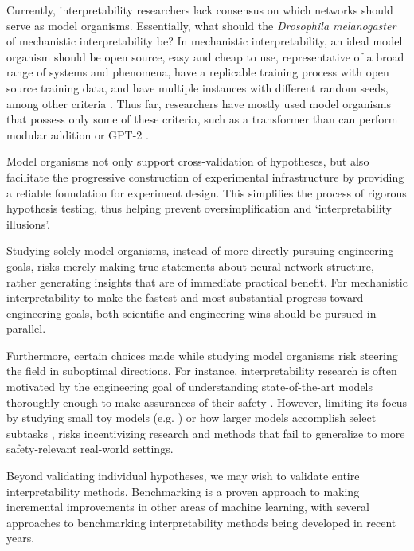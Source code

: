 Currently, interpretability researchers lack consensus on which networks should serve as model organisms. Essentially, what should the \textit{Drosophila melanogaster} of mechanistic interpretability be? In mechanistic interpretability, an ideal model organism should be open source, easy and cheap to use, representative of a broad range of systems and phenomena, have a replicable training process with open source training data, and have multiple instances with different random seeds, among other criteria \citep{Sharkey_2022_CurrentThemes}. Thus far, researchers have mostly used model organisms that possess only some of these criteria, such as a transformer than can perform modular addition \citep{nanda2023progressmeasuresgrokkingmechanistic} or GPT-2 \citep{radford2018language}.

Model organisms not only support cross-validation of hypotheses, but also facilitate the progressive construction of experimental infrastructure by providing a reliable foundation for experiment design. This simplifies the process of rigorous hypothesis testing, thus helping prevent oversimplification and `interpretability illusions'.

Studying solely model organisms, instead of more directly pursuing engineering goals, risks merely making true statements about neural network structure, rather generating insights that are of immediate practical benefit. For mechanistic interpretability to make the fastest and most substantial progress toward engineering goals, both scientific and engineering wins should be pursued in parallel.

Furthermore, certain choices made while studying model organisms risk steering the field in suboptimal directions. For instance, interpretability research is often motivated by the engineering goal of understanding state-of-the-art models thoroughly enough to make assurances of their safety \citep{Bereska_2024_MechInterpReview,tegmark2023provablysafesystemspath, dalrymple2024guaranteedsafeaiframework}. However, limiting its focus by studying small toy models (e.g. \citet{nanda2023progressmeasuresgrokkingmechanistic}) or how larger models accomplish select subtasks \citep{arditi2024refusallanguagemodelsmediated}, risks incentivizing research and methods that fail to generalize to more safety-relevant real-world settings.

\label{par:benchmarks}

Beyond validating individual hypotheses, we may wish to validate entire interpretability methods. Benchmarking is a proven approach to making incremental improvements in other areas of machine learning, with several approaches to benchmarking interpretability methods being developed in recent years.

